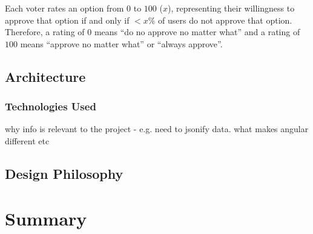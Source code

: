 Each voter rates an option from $0$ to $100$ ($x$), representing their willingness to approve that option if and only if $<x\%$ of users do not approve that option. Therefore, a rating of $0$ means ``do no approve no matter what'' and a rating of $100$ means ``approve no matter what'' or ``always approve''.

\subsection{Architecture}

\subsubsection{Technologies Used}
why info is relevant to the project - e.g. need to jsonify data. what makes angular different etc
\subsection{Design Philosophy}

\section{Summary}



